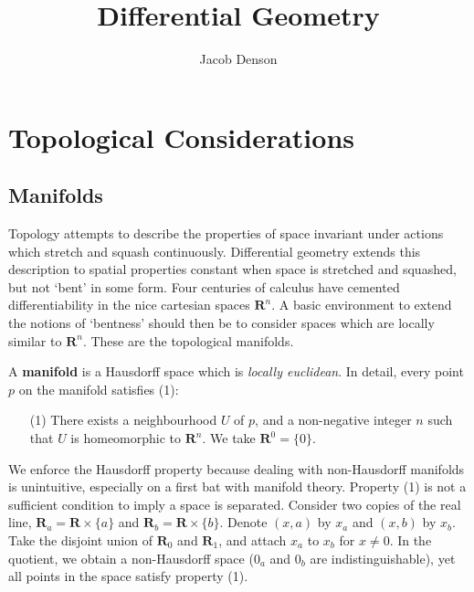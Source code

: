 

\title{Differential Geometry}
\author{Jacob Denson}



\maketitle
\tableofcontents
{}

\chapter{Topological Considerations}

\section{Manifolds}

Topology attempts to describe the properties of space invariant under actions which stretch and squash continuously. Differential geometry extends this description to spatial properties constant when space is stretched and squashed, but not `bent' in some form. Four centuries of calculus have cemented differentiability in the nice cartesian spaces $\mathbf{R}^n$. A basic environment to extend the notions of `bentness' should then be to consider spaces which are locally similar to $\mathbf{R}^n$. These are the topological manifolds.

\begin{definition}
    A {\bf manifold} is a Hausdorff space which is {\it locally euclidean}. In detail, every point $p$ on the manifold satisfies (1):
    \begin{enumerate}
        \item[(1)] There exists a neighbourhood $U$ of $p$, and a non-negative integer $n$ such that $U$ is homeomorphic to $\mathbf{R}^n$. We take $\mathbf{R}^0 = \{0\}$.
    \end{enumerate}
\end{definition}

We enforce the Hausdorff property because dealing with non-Hausdorff manifolds is unintuitive, especially on a first bat with manifold theory. Property (1) is not a sufficient condition to imply a space is separated. Consider two copies of the real line, $\mathbf{R}_a = \mathbf{R} \times \{a\}$ and $\mathbf{R}_b = \mathbf{R} \times \{b\}$. Denote $(x,a)$ by $x_a$ and $(x, b)$ by $x_b$. Take the disjoint union of $\mathbf{R}_0$ and $\mathbf{R}_1$, and attach $x_a$ to $x_b$ for $x \neq 0$. In the quotient, we obtain a non-Hausdorff space ($0_a$ and $0_b$ are indistinguishable), yet all points in the space satisfy property (1).

